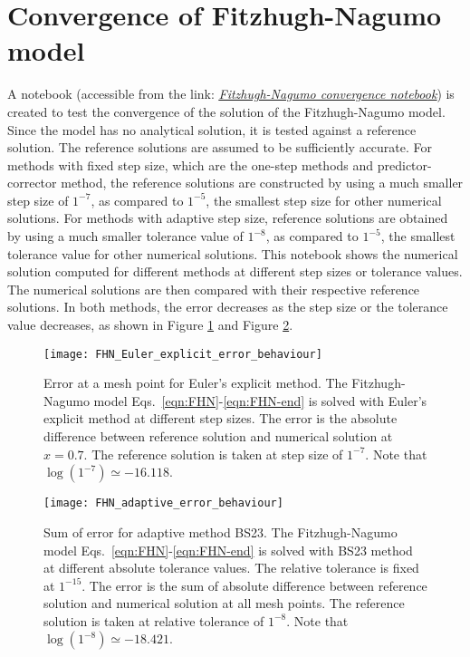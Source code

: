 \section{Convergence of Fitzhugh-Nagumo model}
\label{sec:FHN-convergence}
A notebook (accessible from the link: \href{https://nbviewer.jupyter.org/github/FarmHJ/numerical-solver/blob/main/examples/fhn_model_convergence.ipynb}{\underline{\emph{Fitzhugh-Nagumo convergence notebook}}}) is created to test the convergence of the solution of the Fitzhugh-Nagumo model. Since the model has no analytical solution, it is tested against a reference solution. The reference solutions are assumed to be sufficiently accurate. For methods with fixed step size, which are the one-step methods and predictor-corrector method, the reference solutions are constructed by using a much smaller step size of $1^{-7}$, as compared to $1^{-5}$, the smallest step size for other numerical solutions. For methods with adaptive step size, reference solutions are obtained by using a much smaller tolerance value of $1^{-8}$, as compared to $1^{-5}$, the smallest tolerance value for other numerical solutions. This notebook shows the numerical solution computed for different methods at different step sizes or tolerance values. The numerical solutions are then compared with their respective reference solutions. In both methods, the error decreases as the step size or the tolerance value decreases, as shown in Figure \ref{fig:Euler_explicit_error} and Figure \ref{fig:adaptive_error}.

\begin{figure}
    \texttt{[image: FHN\_Euler\_explicit\_error\_behaviour]}
    \caption{Error at a mesh point for Euler's explicit method. The Fitzhugh-Nagumo model Eqs.~\eqref{eqn:FHN}-\eqref{eqn:FHN-end} is solved with Euler's explicit method at different step sizes. The error is the absolute difference between reference solution and numerical solution at $x=0.7$. The reference solution is taken at step size of $1^{-7}$. Note that $\log(1^{-7})\simeq-16.118$.}
    \label{fig:Euler_explicit_error}
 \end{figure}
\begin{figure}
   \texttt{[image: FHN\_adaptive\_error\_behaviour]}
   \caption{Sum of error for adaptive method BS23. The Fitzhugh-Nagumo model Eqs.~\eqref{eqn:FHN}-\eqref{eqn:FHN-end} is solved with BS23 method at different absolute tolerance values. The relative tolerance is fixed at $1^{-15}$. The error is the sum of absolute difference between reference solution and numerical solution at all mesh points. The reference solution is taken at relative tolerance of $1^{-8}$. Note that $\log(1^{-8})\simeq-18.421$.}
   \label{fig:adaptive_error}
\end{figure}
